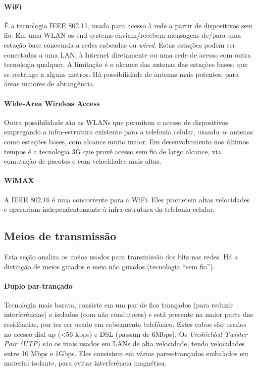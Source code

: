 \paragraph{WiFi} É a tecnologia IEEE 802.11, usada para acesso à rede a partir de dispositivos sem fio. Em uma WLAN os end systems enviam/recebem mensagens de/para uma estação base conectada a redes cabeadas ou \emph{wired}. Estas estações podem ser conectadas a uma LAN, à Internet diretamente ou uma rede de acesso com outra tecnologia qualquer. A limitação é o alcance das antenas das estações bases, que se restringe a alguns metros. Há possibilidade de antenas mais potentes, para áreas maiores de abrangência.

\paragraph{Wide-Area Wireless Access} Outra possibilidade são as WLANs que permitem o acesso de dispositivos empregando a infra-estrutura existente para a telefonia celular, usando as antenas como estações bases, com alcance muito maior. Em desenvolvimento nos últimos tempos é a tecnologia 3G que provê acesso sem fio de largo alcance, via comutação de pacotes e com velocidades mais altas.

\paragraph{WiMAX} A IEEE 802.16 é uma concorrente para a WiFi. Eles prometem altas velocidades e operariam independentemente à infra-estrutura da telefonia celular.

\subsection{Meios de transmissão}

Esta seção analiza os meios usados para transmissão dos bits nas redes. Há a distinção de meios guiados e meio não guiados (tecnologia ``sem fio'').

\paragraph{Duplo par-trançado}
Tecnologia mais barata, consiste em um par de fios trançados (para reduzir interferências) e isolados (com não condutores) e está presente na maior parte das residências, por ter ser usado em cabeamento telefônico. Estes cabos são usados no acesso dial-up (<56 kbps) e DSL (passam de 6Mbps). Os \emph{Unshielded Twister Pair (UTP)} são os mais usados em LANs de alta velocidade, tendo velocidades entre 10 Mbps e 1Gbps. Eles consistem em vários pares-trançados embalados em material isolante, para evitar interferência magnética.

